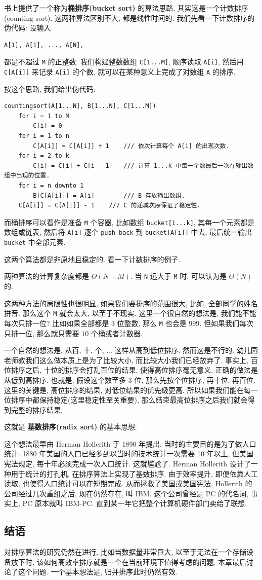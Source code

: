 \documentclass[a4paper]{ctexart}
\theoremstyle{definition}
\theoremstyle{definition}
\begin{document}
书上提供了一个称为{\bf 桶排序(bucket sort)} 的算法思路,
其实这是一个计数排序(counting sort). 这两种算法区别不大, 都是线性时间的.
我们先看一下计数排序的伪代码: 设输入
\begin{verbatim}
A[1], A[1], ..., A[N],
\end{verbatim}
都是不超过 \verb|M| 的正整数. 我们构建整数数组 \verb|C[1...M]|,
顺序读取 \verb|A[i]|, 然后用 \verb|C[A[i]]| 来记录 \verb|A[i]| 的个数,
就可以在某种意义上完成了对数组 \verb|A| 的排序.

按这个思路, 我们给出伪代码:

\begin{verbatim}
countingsort(A[1...N], B[1...N], C[1...M])
    for i = 1 to M
        C[i] = 0
    for i = 1 to n
        C[A[i]] = C[A[i]] + 1    /// 依次计算每个 A[i] 的出现次数.
    for i = 2 to k
        C[i] = C[i] + C[i - 1]   /// 计算 1...k 中每一个数最后一次在输出数组中出现的位置.
    for i = n downto 1
        B[C[A[i]]] = A[i]        /// B 存放输出数组.
	C[A[i]] = C[A[i]] - 1    /// C 的递减次序保证了稳定性.
\end{verbatim}
而桶排序可以看作是准备 \verb|M| 个容器, 比如数组 \verb|bucket[1...k]|,
其每一个元素都是数组或链表, 然后将 \verb|A[i]| 逐个 \verb|push_back|
到 \verb|bucket[A[i]]| 中去, 最后统一输出 \verb|bucket| 中全部元素. 

这两个算法都是非原地且稳定的. 看一下计数排序的例子. 

两种算法的计算复杂度都是 $\Theta(N + M)$. 当 \verb|N| 远大于 \verb|M| 时,
可以认为是 $\Theta(N)$ 的.

这两种方法的局限性也很明显, 如果我们要排序的范围很大, 比如,
全部同学的姓名拼音. 那么这个 \verb|M| 就会太大, 以至于不现实.
这里一个很自然的想法是, 我们能不能每次只排一位? 比如如果全部都是 $3$ 位整数,
那么 \verb|M| 也会是 $999$. 但如果我们每次只排一位,
那么就只需要 $10$ 个桶或者计数器. 

一个自然的想法是, 从百, 十, 个, ... 这样从高到低位排序. 然而这是不行的.
幼儿园老师教我们这么做本质上是为了比较大小, 而比较大小我们已经放弃了.
事实上, 百位排序之后, 十位的排序会打乱百位的结果, 使得高位排序毫无意义.
正确的做法是从低到高排序. 也就是, 假设这个数至多 3 位, 那么先按个位排序,
再十位, 再百位. 这里的关键是, 高位排序的结果, 对低位结果的优先级更高.
所以如果我们能在每一位排序中都保持稳定(这里稳定性至关重要),
那么结束最高位排序之后我们就会得到完整的排序结果.


这就是 {\bf 基数排序(radix sort)} 的基本思想.

这个想法最早由 Herman Hollerith 于 1890 年提出.
当时的主要目的是为了做人口统计.
1880 年美国的人口已经多到以当时的技术统计一次需要 10 年以上, 但美国宪法规定,
每十年必须完成一次人口统计. 这就尴尬了. Herman Hollerith 设计了一种用于统计的打孔机,
在排序算法上实现了基数排序. 由于效率提升, 即便依靠人工读取, 也使得人口统计可以在短期完成.
从而拯救了美国或美国宪法. Hollerith 的公司经过几次重组之后, 现在仍然存在,
叫 IBM. 这个公司曾经是 PC 的代名词, 事实上, PC 原本就叫 IBM-PC.
直到某一年它把整个计算机硬件部门卖给了联想. 

\subsection{结语}
对排序算法的研究仍然在进行, 比如当数据量非常巨大, 以至于无法在一个存储设备放下时,
该如何高效率排序就是一个在当前环境下值得考虑的问题. 本章最后讨论了这个问题.
一个基本想法是, 归并排序此时仍然有效.




\end{document}

